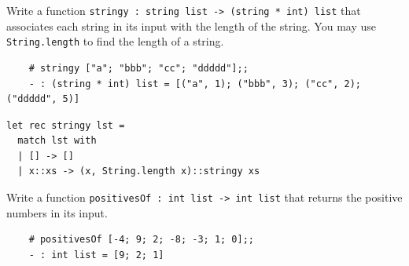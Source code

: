 \documentclass[addpoints]{exam}
\begin{document}
\begin{questions}
 
  
  \question 
  Write a function \texttt{stringy : string list -> (string * int) list}
  that associates each string in its input with the length of the string.
  You may use \texttt{String.length} to find the length of a string.
  \begin{verbatim}
    # stringy ["a"; "bbb"; "cc"; "ddddd"];;                                               
    - : (string * int) list = [("a", 1); ("bbb", 3); ("cc", 2); ("ddddd", 5)]
  \end{verbatim}

  \begin{solutionbox}{3cm}
    \begin{verbatim}
let rec stringy lst =
  match lst with
  | [] -> []
  | x::xs -> (x, String.length x)::stringy xs
    \end{verbatim}
  \end{solutionbox}


  \question 
  Write a function \texttt{positivesOf : int list -> int list}
  that returns the positive numbers in its input.
  \begin{verbatim}
    # positivesOf [-4; 9; 2; -8; -3; 1; 0];;
    - : int list = [9; 2; 1]
  \end{verbatim}
  

\end{questions}
\end{document}
